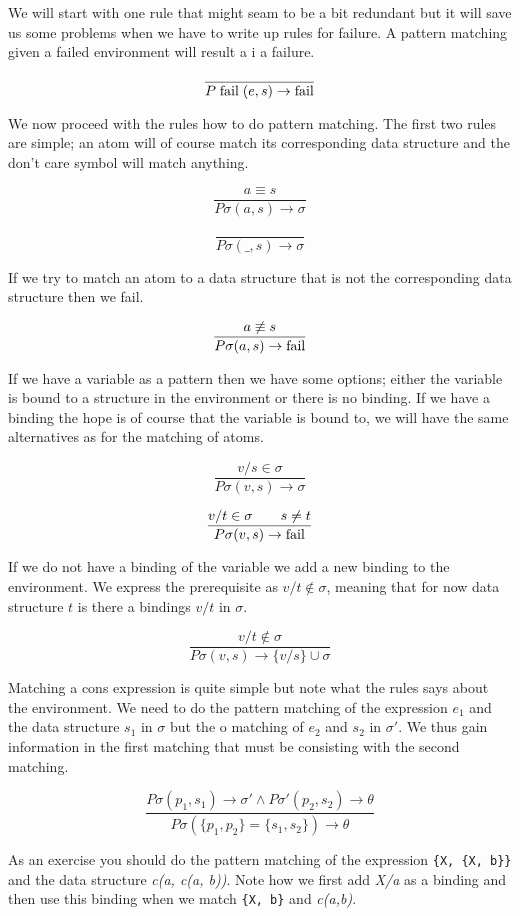 \documentclass[a4paper,11pt]{article}
\begin{document}
We will start with one rule that might seam to be a bit redundant but
it will save us some problems when we have to write up rules for
failure. A pattern matching given a failed environment will result a i
a failure.

$$\frac{}{P\;{\rm fail}\;(e, s) \rightarrow {\rm fail}}$$ 

We now proceed with the rules how to do pattern matching. The first
two rules are simple; an atom will of course match its corresponding
data structure and the don't care symbol will match anything.

$$\frac{a \equiv s}{P\sigma(a, s) \rightarrow \sigma}$$ 

$$\frac{}{P\sigma(\_,s) \rightarrow \sigma}$$

If we try to match an atom to a data structure that is not the
corresponding data structure then we fail.

$$\frac{a \not\equiv s}{P\sigma(a, s) \rightarrow {\rm fail}}$$ 

If we have a variable as a pattern then we have some options; either
the variable is bound to a structure in the environment or there is no
binding. If we have a binding the hope is of course that the variable
is bound to, we will have the same alternatives as for the matching of
atoms.

$$\frac{v/s \in \sigma}{P\sigma(v, s) \rightarrow \sigma}$$

$$\frac{v/t \in \sigma  \qquad s \not= t}{P\sigma(v, s) \rightarrow {\rm fail}}$$

If we do not have a binding of the variable we add a new binding to
the environment. We express the prerequisite as $v/t \not\in \sigma$,
meaning that for now data structure $t$ is there a bindings $v/t$ in
$\sigma$.

$$\frac{v/t \not\in \sigma}{P\sigma(v, s) \rightarrow \lbrace v/s \rbrace \cup \sigma}$$ 

Matching a cons expression is quite simple but note what the rules
says about the environment. We need to do the pattern matching of the
expression $e_1$ and the data structure $s_1$ in $\sigma$ but the
o matching of $e_2$ and $s_2$ in $\sigma'$. We thus gain information in
the first matching that must be consisting with the second matching.

$$\frac{P\sigma(p_1, s_1) \rightarrow \sigma' \wedge P\sigma'(p_2, s_2) \rightarrow \theta}{P\sigma(\lbrace p_1, p_2 \rbrace  = \lbrace s_1, s_2 \rbrace) \rightarrow \theta}$$

As an exercise you should do the pattern matching of the expression
{\tt \{X, \{X, b\}\}} and the data structure {\em c(a, c(a, b))}. Note
how we first add {\em X/a} as a binding and then use this binding when
we match {\tt \{X, b\}} and {\em c(a,b)}.
\end{document}
